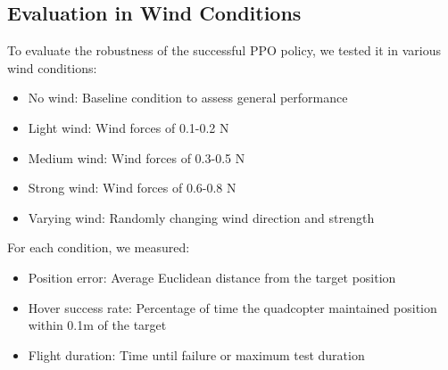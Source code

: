 \documentclass[12pt]{article}
\begin{document}

\subsection{Evaluation in Wind Conditions}

To evaluate the robustness of the successful PPO policy, we tested it in various wind conditions:


\begin{itemize}
    \item No wind: Baseline condition to assess general performance
    \item Light wind: Wind forces of 0.1-0.2 N
    \item Medium wind: Wind forces of 0.3-0.5 N
    \item Strong wind: Wind forces of 0.6-0.8 N
    \item Varying wind: Randomly changing wind direction and strength
\end{itemize}


For each condition, we measured:
\begin{itemize}
    \item Position error: Average Euclidean distance from the target position
    \item Hover success rate: Percentage of time the quadcopter maintained position within 0.1m of the target
    \item Flight duration: Time until failure or maximum test duration
\end{itemize}

\end{document}
